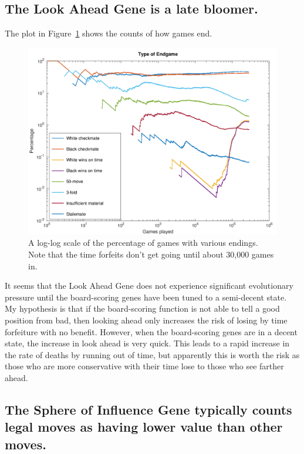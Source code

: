 \documentclass[letterpaper]{article}
\renewcommand{\_}{\allowbreak\textunderscore\allowbreak}
\begin{document}
\subsection{The Look Ahead Gene is a late bloomer.}

The plot in Figure~\ref{game-ending-plot} shows the counts of how games end.
\begin{figure}[htb]
	\centering
	\includegraphics[width=\textwidth]{game-endings-log-plot}
	\caption{A log-log scale of the percentage of games with various endings. Note that the time forfeits don't get going until about 30,000 games in.}\label{game-ending-plot}
\end{figure}
It seems that the Look Ahead Gene does not experience significant evolutionary pressure until the board-scoring genes have been tuned to a semi-decent state. My hypothesis is that if the board-scoring function is not able to tell a good position from bad, then looking ahead only increases the risk of losing by time forfeiture with no benefit. However, when the board-scoring genes are in a decent state, the increase in look ahead is very quick. This leads to a rapid increase in the rate of deaths by running out of time, but apparently this is worth the risk as those who are more conservative with their time lose to those who see farther ahead.

\subsection{The Sphere of Influence Gene typically counts legal moves as having lower value than other moves.}
\end{document}
